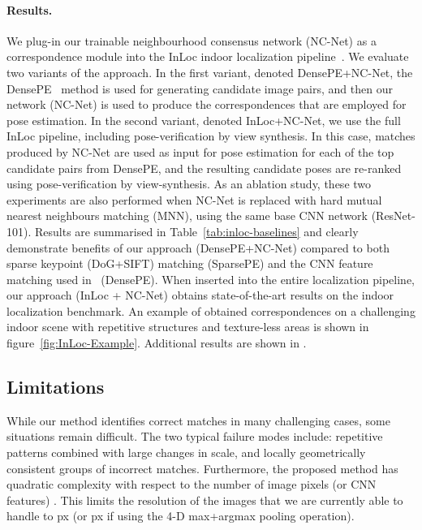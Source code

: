 \documentclass{article}
\begin{document}
\paragraph{Results.}
We plug-in our trainable neighbourhood consensus network (NC-Net) as a correspondence module into the InLoc indoor localization pipeline~\cite{Taira18}. We evaluate two variants of the approach. In the first variant, denoted DensePE+NC-Net, 
the DensePE~\cite{Taira18} method is used for generating candidate image pairs, and then our network (NC-Net) is used to produce the correspondences that are employed for pose estimation.
In the second variant, denoted InLoc+NC-Net, we use the full InLoc pipeline, including pose-verification by view synthesis. In this case, matches produced by NC-Net are used as input for pose estimation for each of the top  candidate pairs from DensePE, and the resulting candidate poses are re-ranked using pose-verification by view-synthesis.
As an ablation study, these two experiments are also performed when NC-Net is replaced with hard mutual nearest neighbours matching (MNN), using the same base CNN network (ResNet-101).
Results are summarised in Table~\ref{tab:inloc-baselines} and clearly demonstrate benefits of our approach ({DensePE+NC-Net}) compared to both sparse keypoint (DoG+SIFT) matching ({SparsePE}) and the CNN feature matching used in~\cite{Taira18} ({DensePE}). When inserted into the entire localization pipeline, our approach ({InLoc + NC-Net}) obtains state-of-the-art results on the indoor localization benchmark.
An example of obtained correspondences on a challenging indoor scene with repetitive structures and texture-less areas is shown in figure~\ref{fig:InLoc-Example}. 
Additional results are shown in .

\subsection{Limitations}
While our method identifies correct matches in many challenging cases, some situations remain difficult. The two typical failure modes include: repetitive patterns combined with large changes in scale, and locally geometrically consistent groups of incorrect matches. Furthermore, the proposed method has quadratic  complexity with respect to the number of image pixels (or CNN features) . This limits the resolution of the images that we are currently able to handle to px (or px if using the 4-D max+argmax pooling operation).
\end{document}

